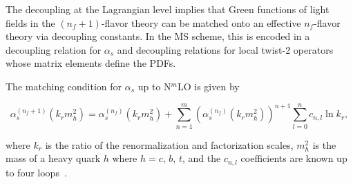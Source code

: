 \documentclass[12pt,notitlepage,aps,preprintnumbers,superscriptaddress,nofootinbib,aps,prd,floatfix]{revtex4-2}
\begin{document}
The decoupling at the Lagrangian level implies that Green functions of light fields in the $(n_f+1)$-flavor theory can be matched onto an effective $n_f$-flavor theory via decoupling constants. In the $\overline{\textrm{MS}}$ scheme, this is encoded in a decoupling relation for $\alpha_s$ and decoupling relations for local twist-2 operators whose matrix elements define the PDFs.

The matching condition for $\alpha_s$ up to N$^m$LO is given by~\cite{Chetyrkin:1997sg,vanRitbergen:1997va}

\begin{equation}
\alpha_s^{(n_f+1)}(k_r m_h^2) = \alpha_s^{(n_f)}(k_rm_h^2) + \sum_{n=1}^m \left( \alpha_s^{(n_f)}(k_rm_h^2) \right)^{n+1} \sum_{l=0}^n c_{n,l} \ln k_r,
\end{equation}

where $k_r$ is the ratio of the renormalization and factorization scales, $m_h^2$ is the mass of a heavy quark $h$ where $h=c, \, b, \, t$, and the $c_{n,l}$ coefficients are known up to four loops~\cite{Chetyrkin:1997sg,vanRitbergen:1997va}. 
\end{document}
